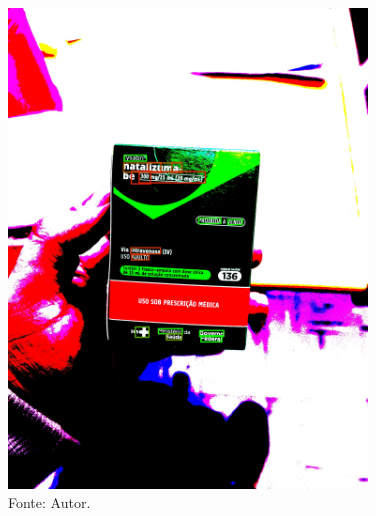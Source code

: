 \begin{frame}
\begin{columns}
\begin{column}{0.5\textwidth}
\begin{figure}
				\includegraphics[width=0.85\textwidth]{../pictures/tysabri_rgb_thresh_boxes.jpg}
				\caption*{Fonte: Autor.}
			\end{figure}
		\end{column}
	\end{columns}
\end{frame}

